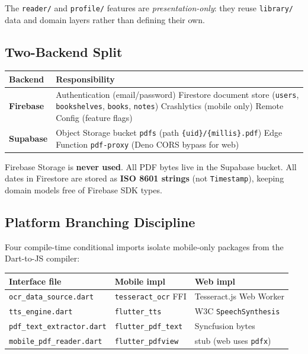 \documentclass[11pt,a4paper]{article}
\begin{document}
The \texttt{reader/} and \texttt{profile/} features are \emph{presentation-only}: they
reuse \texttt{library/} data and domain layers rather than defining their own.

\subsection{Two-Backend Split}

\vspace{4pt}
\begin{tabularx}{\textwidth}{@{}L{2.8cm} L{11.0cm}@{}}
  \toprule
  \textbf{Backend} & \textbf{Responsibility} \\
  \midrule
  \textbf{Firebase} &
    Authentication (email/password) \textbullet{} Firestore document store
    (\texttt{users}, \texttt{bookshelves}, \texttt{books}, \texttt{notes}) \textbullet{}
    Crashlytics (mobile only) \textbullet{} Remote Config (feature flags) \\
  \textbf{Supabase} &
    Object Storage bucket \texttt{pdfs} (path \texttt{\{uid\}/\{millis\}.pdf}) \textbullet{}
    Edge Function \texttt{pdf-proxy} (Deno CORS bypass for web) \\
  \bottomrule
\end{tabularx}
\vspace{2pt}

Firebase Storage is \textbf{never used}. All PDF bytes live in the Supabase bucket.
All dates in Firestore are stored as \textbf{ISO 8601 strings} (not
\texttt{Timestamp}), keeping domain models free of Firebase SDK types.

\subsection{Platform Branching Discipline}

Four compile-time conditional imports isolate mobile-only packages from the Dart-to-JS
compiler:

\vspace{4pt}
\begin{tabularx}{\textwidth}{@{}L{5.0cm} L{3.8cm} L{4.8cm}@{}}
  \toprule
  \textbf{Interface file} & \textbf{Mobile impl} & \textbf{Web impl} \\
  \midrule
  \texttt{ocr\_data\_source.dart} & \texttt{tesseract\_ocr} FFI & Tesseract.js Web Worker \\
  \texttt{tts\_engine.dart} & \texttt{flutter\_tts} & W3C \texttt{SpeechSynthesis} \\
  \texttt{pdf\_text\_extractor.dart} & \texttt{flutter\_pdf\_text} & Syncfusion bytes \\
  \texttt{mobile\_pdf\_reader.dart} & \texttt{flutter\_pdfview} & stub (web uses \texttt{pdfx}) \\
  \bottomrule
\end{tabularx}
\vspace{2pt}
\end{document}
